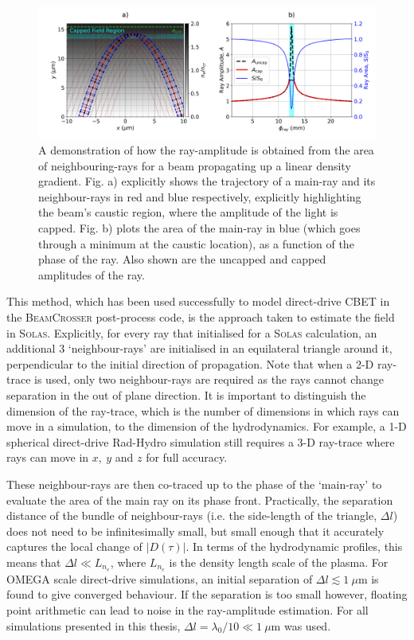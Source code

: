 \begin{figure}[t!]
    \includegraphics[width=\linewidth]{Numerics/Images/FieldCap_Diagram.png}
    \centering
    \caption{A demonstration of how the ray-amplitude is obtained from the area of neighbouring-rays for a beam propagating up a linear density gradient.
    Fig. a) explicitly shows the trajectory of a main-ray and its neighbour-rays in red and blue respectively, explicitly highlighting the beam's caustic region, where the amplitude of the light is capped.
    Fig. b) plots the area of the main-ray in blue (which goes through a minimum at the caustic location), as a function of the phase of the ray.
    Also shown are the uncapped and capped amplitudes of the ray.}%
    \label{fig:SOLAS_fieldcap_diagram}
\end{figure}

This method, which has been used successfully to model direct-drive \ac{CBET} in the \textsc{BeamCrosser} post-process code, is the approach taken to estimate the field in \textsc{Solas}.
Explicitly, for every ray that initialised for a \textsc{Solas} calculation, an additional 3 `neighbour-rays' are initialised in an equilateral triangle around it, perpendicular to the initial direction of propagation.
Note that when a 2-D ray-trace is used, only two neighbour-rays are required as the rays cannot change separation in the out of plane direction.
It is important to distinguish the dimension of the ray-trace, which is the number of dimensions in which rays can move in a simulation, to the dimension of the hydrodynamics.
For example, a 1-D spherical direct-drive \ac{Rad-Hydro} simulation still requires a 3-D ray-trace where rays can move in $x,\ y$ and $z$ for full accuracy.

These neighbour-rays are then co-traced up to the phase of the `main-ray' to evaluate the area of the main ray on its phase front.
Practically, the separation distance of the bundle of neighbour-rays (i.e. the side-length of the triangle, $\Delta l$) does not need to be infinitesimally small, but small enough that it accurately captures the local change of $|D(\tau)|$.
In terms of the hydrodynamic profiles, this means that $\Delta l \ll L_{n_e}$, where $L_{n_e}$ is the density length scale of the plasma.
For OMEGA scale direct-drive simulations, an initial separation of $\Delta l\lesssim 1\ \mu\text{m}$ is found to give converged behaviour.
If the separation is too small however, floating point arithmetic can lead to noise in the ray-amplitude estimation.
For all simulations presented in this thesis, $\Delta l=\lambda_0/10\ll1\ \mu\text{m}$ was used.

